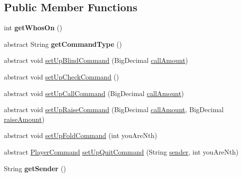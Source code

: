 \subsection*{Public Member Functions}
\begin{DoxyCompactItemize}
\item 
\hypertarget{classhu_1_1elte_1_1bfw1p6_1_1poker_1_1command_1_1_player_command_aba1ce387ad5219485205633b7df68e1d}{}int {\bfseries get\+Whos\+On} ()\label{classhu_1_1elte_1_1bfw1p6_1_1poker_1_1command_1_1_player_command_aba1ce387ad5219485205633b7df68e1d}

\item 
\hypertarget{classhu_1_1elte_1_1bfw1p6_1_1poker_1_1command_1_1_player_command_a8b334dc0753c18c416cbbd18c9f832d9}{}abstract String {\bfseries get\+Command\+Type} ()\label{classhu_1_1elte_1_1bfw1p6_1_1poker_1_1command_1_1_player_command_a8b334dc0753c18c416cbbd18c9f832d9}

\item 
abstract void \hyperlink{classhu_1_1elte_1_1bfw1p6_1_1poker_1_1command_1_1_player_command_a3cc8b2a107a16d210fee9c4d16cf2485}{set\+Up\+Blind\+Command} (Big\+Decimal \hyperlink{classhu_1_1elte_1_1bfw1p6_1_1poker_1_1command_1_1_player_command_a6ccfc341bcd13c5dd21e8c9d00402f17}{call\+Amount})
\item 
abstract void \hyperlink{classhu_1_1elte_1_1bfw1p6_1_1poker_1_1command_1_1_player_command_adc8388e6152b20c235400e1bf82f94b7}{set\+Up\+Check\+Command} ()
\item 
abstract void \hyperlink{classhu_1_1elte_1_1bfw1p6_1_1poker_1_1command_1_1_player_command_a0b48c11757d92107090b9256514096bd}{set\+Up\+Call\+Command} (Big\+Decimal \hyperlink{classhu_1_1elte_1_1bfw1p6_1_1poker_1_1command_1_1_player_command_a6ccfc341bcd13c5dd21e8c9d00402f17}{call\+Amount})
\item 
abstract void \hyperlink{classhu_1_1elte_1_1bfw1p6_1_1poker_1_1command_1_1_player_command_a8eadb1571e571cdc3bbdb1adf4c684e1}{set\+Up\+Raise\+Command} (Big\+Decimal \hyperlink{classhu_1_1elte_1_1bfw1p6_1_1poker_1_1command_1_1_player_command_a6ccfc341bcd13c5dd21e8c9d00402f17}{call\+Amount}, Big\+Decimal \hyperlink{classhu_1_1elte_1_1bfw1p6_1_1poker_1_1command_1_1_player_command_a188c92b4508db681e74d8cf84cd6b2b8}{raise\+Amount})
\item 
abstract void \hyperlink{classhu_1_1elte_1_1bfw1p6_1_1poker_1_1command_1_1_player_command_a5adc16132ea3a16854f67a165af5d9fd}{set\+Up\+Fold\+Command} (int you\+Are\+Nth)
\item 
abstract \hyperlink{classhu_1_1elte_1_1bfw1p6_1_1poker_1_1command_1_1_player_command}{Player\+Command} \hyperlink{classhu_1_1elte_1_1bfw1p6_1_1poker_1_1command_1_1_player_command_a0846158469629be51f4e66d15e29baf6}{set\+Up\+Quit\+Command} (String \hyperlink{classhu_1_1elte_1_1bfw1p6_1_1poker_1_1command_1_1_player_command_aadab45496b9dd59dc734f14e574db2ca}{sender}, int you\+Are\+Nth)
\item 
\hypertarget{classhu_1_1elte_1_1bfw1p6_1_1poker_1_1command_1_1_player_command_a684903e1ed774d569e4b31092e9571bc}{}String {\bfseries get\+Sender} ()\label{classhu_1_1elte_1_1bfw1p6_1_1poker_1_1command_1_1_player_command_a684903e1ed774d569e4b31092e9571bc}


\end{DoxyCompactItemize}
